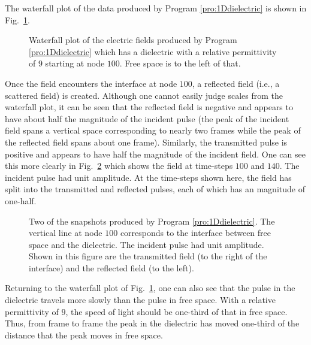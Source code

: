 The waterfall plot of the data produced by Program
\ref{pro:1Ddielectric} is shown in Fig.\ \ref{fig:waterfallDielec}.
\begin{figure}
  \begin{center}
  \end{center}
  \caption{Waterfall plot of the electric fields produced by Program
  \ref{pro:1Ddielectric} which has a dielectric with a relative
  permittivity of $9$ starting at node $100$.  Free space is to the
  left of that.}  \label{fig:waterfallDielec}
\end{figure}
Once the field encounters the interface at node $100$, a reflected
field (i.e., a scattered field) is created.  Although one cannot
easily judge scales from the waterfall plot, it can be seen that the
reflected field is negative and appears to have about half the
magnitude of the incident pulse (the peak of the incident field spans
a vertical space corresponding to nearly two frames while the peak of
the reflected field spans about one frame).  Similarly, the
transmitted pulse is positive and appears to have half the magnitude
of the incident field.  One can see this more clearly in Fig.\
\ref{fig:1DdiectricSnaps} which shows the field at time-steps $100$
and $140$.  The incident pulse had unit amplitude.  At the time-steps
shown here, the field has split into the transmitted and reflected
pulses, each of which has an magnitude of one-half.
\begin{figure}
  \begin{center}
  \end{center}
  \caption{Two of the snapshots produced by Program
  \ref{pro:1Ddielectric}.  The vertical line at node $100$ corresponds
  to the interface between free space and the dielectric.  The
  incident pulse had unit amplitude.  Shown in this figure are the
  transmitted field (to the right of the interface) and the reflected
  field (to the left).}  \label{fig:1DdiectricSnaps}
\end{figure}

Returning to the waterfall plot of Fig.\ \ref{fig:waterfallDielec},
one can also see that the pulse in the dielectric travels more slowly
than the pulse in free space.  With a relative permittivity of $9$,
the speed of light should be one-third of that in free space.  Thus,
from frame to frame the peak in the dielectric has moved one-third of
the distance that the peak moves in free space.

